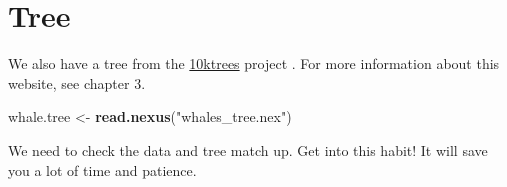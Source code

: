 \documentclass[
]{book}
\newenvironment{Shaded}{\begin{snugshade}}{\end{snugshade}}
\newcommand{\DataTypeTok}[1]{\textcolor[rgb]{0.13,0.29,0.53}{#1}}
\newcommand{\KeywordTok}[1]{\textcolor[rgb]{0.13,0.29,0.53}{\textbf{#1}}}
\newcommand{\NormalTok}[1]{#1}
\newcommand{\OperatorTok}[1]{\textcolor[rgb]{0.81,0.36,0.00}{\textbf{#1}}}
\newcommand{\StringTok}[1]{\textcolor[rgb]{0.31,0.60,0.02}{#1}}
\begin{document}
\begin{Shaded}
\end{Shaded}

\hypertarget{tree}{%
\section{Tree}\label{tree}}

We also have a tree from the \href{https://10ktrees.nunn-lab.org/}{10ktrees} project \citep{Arnold10}. For more information about this website, see chapter 3.

\begin{Shaded}
\begin{Highlighting}[]
\NormalTok{whale.tree \textless{}{-}}\StringTok{ }\KeywordTok{read.nexus}\NormalTok{(}\StringTok{"whales\_tree.nex"}\NormalTok{)}
\end{Highlighting}
\end{Shaded}

We need to check the data and tree match up. Get into this habit! It will save you a lot of time and patience.

\begin{Shaded}
\end{Shaded}
\end{document}
